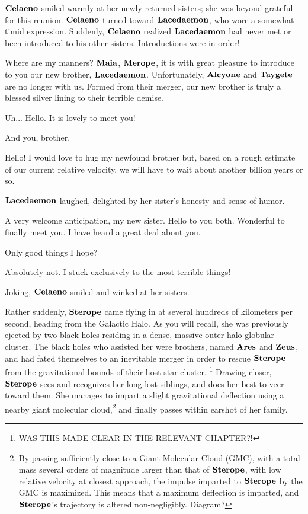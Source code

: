 \documentclass[main.tex]{subfiles}
\begin{document}
\par \nar $\Celaeno$ smiled warmly at her newly returned sisters; she was beyond grateful for this reunion.  $\Celaeno$ turned toward $\Lacedaemon$, who wore a somewhat timid expression.  Suddenly, $\Celaeno$ realized $\Lacedaemon$ had never met or been introduced to his other sisters.  Introductions were in order!

\par \Celaeno  Where are my manners?  $\Maia$, $\Merope$, it is with great pleasure to introduce to you our new brother, $\Lacedaemon$.  Unfortunately, $\Alcyone$ and $\Taygete$ are no longer with us.  Formed from their merger, our new brother is truly a blessed silver lining to their terrible demise.

\par \Lacedaemon Uh... Hello.  It is lovely to meet you!

\par \Merope And you, brother.

\par \Maia Hello!  I would love to hug my newfound brother but, based on a rough estimate of our current relative velocity, we will have to wait about another billion years or so.

\par \nar $\Lacedaemon$ laughed, delighted by her sister's honesty and sense of humor.

\par \Lacedaemon A very welcome anticipation, my new sister.  Hello to you both.  Wonderful to finally meet you.  I have heard a great deal about you.

\par \Merope Only good things I hope?

\par \Celaeno Absolutely not.  I stuck exclusively to the most terrible things!

\par \nar Joking, $\Celaeno$ smiled and winked at her sisters.

\par \nar Rather suddenly, $\Sterope$ came flying in at several hundreds of kilometers per second, heading from the Galactic Halo.  As you will recall, she was previously ejected by two black holes residing in a dense, massive outer halo globular cluster.  The black holes who assisted her were brothers, named $\Ares$ and $\Zeus$, and had fated themselves to an inevitable merger in order to rescue $\Sterope$ from the gravitational bounds of their host star cluster. \footnote{WAS THIS MADE CLEAR IN THE RELEVANT CHAPTER?!} Drawing closer, $\Sterope$ sees and recognizes her long-lost siblings, and does her best to veer toward them.  She manages to impart a slight gravitational deflection using a nearby giant molecular cloud,\footnote{By passing sufficiently close to a Giant Molecular Cloud (GMC), with a total mass several orders of magnitude larger than that of $\Sterope$, with low relative velocity at closest approach, the impulse imparted to $\Sterope$ by the GMC is maximized.  This means that a maximum deflection is imparted, and $\Sterope$'s trajectory is altered non-negligibly.  Diagram?} and finally passes within earshot of her family.  
\end{document}
